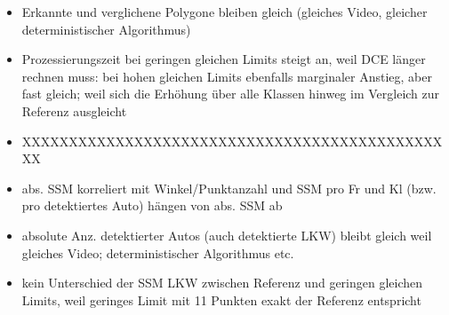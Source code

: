 {\begin{itemize}
\begin{itemize}
			\item Erkannte und verglichene Polygone bleiben gleich (gleiches Video, gleicher deterministischer Algorithmus)
			\item Prozessierungszeit bei geringen gleichen Limits steigt an, weil DCE länger rechnen muss: bei hohen gleichen Limits ebenfalls marginaler Anstieg, aber fast gleich; weil sich die Erhöhung über alle Klassen hinweg im Vergleich zur Referenz ausgleicht
			\item XXXXXXXXXXXXXXXXXXXXXXXXXXXXXXXXXXXXXXXXXXXXXXX
			\item abs. SSM korreliert mit Winkel/Punktanzahl und SSM pro Fr und Kl (bzw. pro detektiertes Auto) hängen von abs. SSM ab
			\item absolute Anz. detektierter Autos (auch detektierte LKW) bleibt gleich weil gleiches Video; deterministischer Algorithmus etc.
			\item kein Unterschied der SSM LKW zwischen Referenz und geringen gleichen Limits, weil geringes Limit mit 11 Punkten exakt der Referenz entspricht
	
		\end{itemize}
	\end{itemize}



}
		




